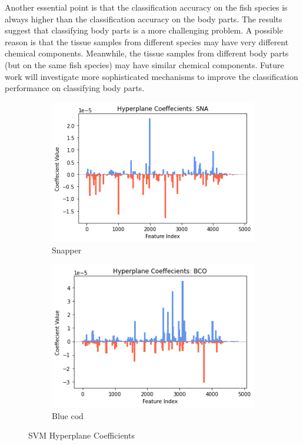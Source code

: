 \documentclass[runningheads]{llncs}
\begin{document}
Another essential point is that the classification accuracy on the fish species is always higher than the classification accuracy on the body parts. 
The results suggest that classifying body parts is a more challenging problem. 
A possible reason is that the tissue samples from different species may have very different chemical components. 
Meanwhile, the tissue samples from different body parts (but on the same fish species) may have similar chemical components. 
Future work will investigate more sophisticated mechanisms to improve the classification performance on classifying body parts. 

\begin{figure}[t]
  \centering
  \begin{subfigure}[b]{.49\linewidth}
    \includegraphics[width=\linewidth]{fish_hyperplane_sna.png}
    \caption{Snapper}\label{fig:hyperplane-sna}
  \end{subfigure}
  \begin{subfigure}[b]{.49\linewidth}
    \includegraphics[width=\linewidth]{fish_hyperplane_bco.png}
    \caption{Blue cod}\label{fig:hyperplane-bco}
  \end{subfigure}
  
  \caption[SVM Coef]{
    SVM Hyperplane Coefficients
  }
  \label{fig:svm-hyperplane}
\end{figure}
\end{document}
